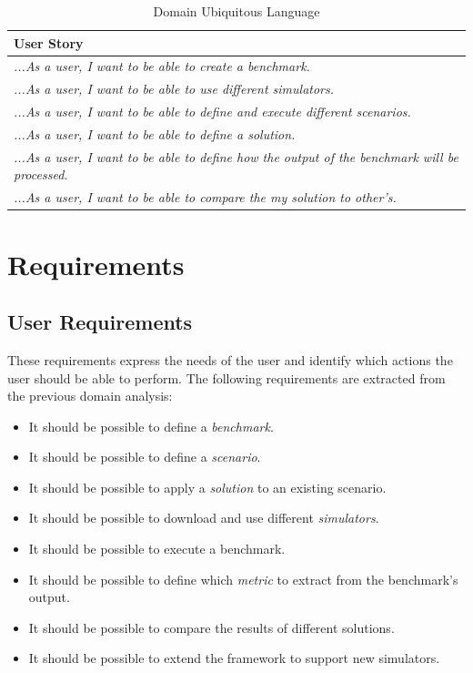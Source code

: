 \documentclass[12pt,a4paper,openright,twoside]{book}
\begin{document}
\begin{table}[H]
  \centering
  \begin{tabular}{|p{}|}
  \toprule
  \textbf{User Story} \\
  \midrule                                                                                                                                                              
  \textit{...As a user, I want to be able to create a benchmark.} \\ \hline
  \textit{...As a user, I want to be able to use different simulators.} \\ \hline
  \textit{...As a user, I want to be able to define and execute different scenarios.} \\ \hline
  \textit{...As a user, I want to be able to define a solution.} \\ \hline
  \textit{...As a user, I want to be able to define how the output of the benchmark will be processed.} \\ \hline
  \textit{...As a user, I want to be able to compare the my solution to other's.} \\ \hline
  \end{tabular}
  \caption{Domain Ubiquitous Language}
\end{table}

\section{Requirements}

\subsection*{User Requirements}
These requirements express the needs of the user and identify which actions the user should be able to perform.
The following requirements are extracted from the previous domain analysis:
\begin{itemize}
  \item It should be possible to define a \emph{benchmark}.
  \item It should be possible to define a \emph{scenario}.
  \item It should be possible to apply a \emph{solution} to an existing scenario.
  \item It should be possible to download and use different \emph{simulators}.
  \item It should be possible to execute a benchmark.
  \item It should be possible to define which \emph{metric} to extract from the benchmark's output.
  \item It should be possible to compare the results of different solutions.
  \item It should be possible to extend the framework to support new simulators.
\end{itemize}
\end{document}
